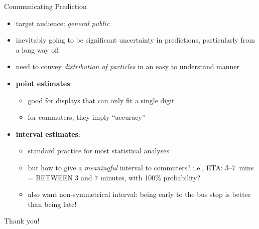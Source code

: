 \documentclass[10pt,t]{beamer}
\begin{document}
\begin{frame}{Communicating Prediction}
  \onslide<+->

  \begin{itemize}[<+- | alert@+>]

  \item target audience: \emph{general public}
    
  \item inevitably going to be significant uncertainty in predictions, 
    particularly from a long way off

  \item need to convey \emph{distribution of particles} in an easy to understand manner

  \item \textbf{point estimates}:
    \begin{itemize}
    \item good for displays that can only fit a single digit
    \item for commuters, they imply ``accuracy''
    \end{itemize}
    
  \item \textbf{interval estimates}:
    \begin{itemize}
    \item standard practice for most statistical analyses
    \item but how to give a \emph{meaningful} interval to commuters?
      i.e., ETA: 3--7~mins = BETWEEN 3 and 7 minutes, with 100\% probability?
    \item also want non-symmetrical interval: being early to the bus stop is better than being late!
    \end{itemize}
  \end{itemize}

  \onslide<+->
\end{frame}




\begin{frame}[standout]
  Thank you!
\end{frame}
\end{document}
